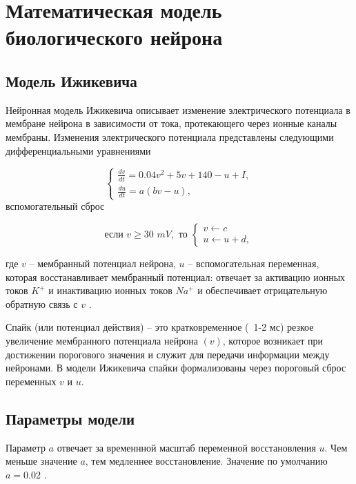 \chapter{Математическая модель биологического нейрона}
\label{ch:chap2}

\section{Модель Ижикевича}
Нейронная модель Ижикевича описывает изменение электрического потенциала в мембране нейрона в зависимости от тока, протекающего через ионные каналы мембраны. Изменения электрического потенциала представлены следующими дифференциальными уравнениями

\begin{equation}
	\begin{cases}
		 \frac{dv}{dt} = 0.04v^2+5v+140-u+I,\\
		\frac{du}{dt} = a(bv-u),
	\end{cases}
\end{equation}
вспомогательный сброс

\begin{equation}
    \text{если } v \geq 30 \, \, mV , \text{ то } \begin{cases}
        v \leftarrow c\\
        u \leftarrow u+d,
    \end{cases}
\end{equation}

где $v$ -- мембранный потенциал нейрона, $u$ -- вспомогательная переменная, которая восстанавливает мембранный потенциал: отвечает за активацию ионных токов $K^+$ и инактивацию ионных токов $Na^+$ и обеспечивает отрицательную обратную связь с $v$ \cite{dhamo2021efficient}.

Спайк (или потенциал действия) -- это кратковременное (~1-2 мс) резкое увеличение мембранного потенциала нейрона $(v)$, которое возникает при достижении порогового значения и служит для передачи информации между нейронами. В модели Ижикевича спайки формализованы через пороговый сброс переменных $v$ и $u$. 


\section{Параметры модели}


Параметр $a$ отвечает за временнной масштаб переменной восстановления $u$. Чем меньше значение $a$, тем медленнее восстановление. Значение по умолчанию  $a=0.02$ \cite{dhamo2021efficient}.

